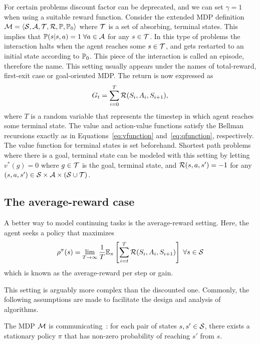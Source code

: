 \begin{example}
  For certain problems discount factor can be deprecated, and we can set $\gamma=1$ when using a suitable reward function. Consider the extended MDP definition $\mathcal{M}=\langle\mathcal{S},\mathcal{A},\mathcal{T},\mathcal{R},\mathbb{P},\mathbb{P}_0\rangle$ where $\mathcal{T}$ is a set of absorbing, terminal states. This implies that $\mathbb{P}(s\lvert s, a) = 1\;\forall a\in\mathcal{A}$ for any $s\in\mathcal{T}$. In this type of problems the interaction halts when the agent reaches some $s\in\mathcal{T}$, and gets restarted to an initial state according to $\mathbb{P}_0$. This piece of the interaction is called an episode, therefore the name. This setting usually appears under the names of total-reward, first-exit case or goal-oriented MDP. The return is now expressed as
  \begin{equation*}
    G_t = \sum_{i=0}^T \mathcal{R}(S_i, A_i, S_{i+1}),
  \end{equation*}
  where $T$ is a random variable that represents the timestep in which agent reaches some terminal state. The value and action-value functions satisfy the Bellman recursions exactly as in Equations~\eqref{eq:vfunction} and~\eqref{eq:qfunction}, respectively. The value function for terminal states is set beforehand. Shortest path problems where there is a goal, terminal state can be modeled with this setting by letting $v^*(g)=0$ where $g\in\mathcal{T}$ is the goal, terminal state, and $\linebreak\cR(s, a, s')=-1$ for any $(s,a,s')\in\mathcal{S}\times\mathcal{A}\times(\mathcal{S}\cup\mathcal{T})$.
\end{example}
\subsection{The average-reward case}
A better way to model continuing tasks is the average-reward setting. Here, the agent seeks a policy that maximizes 
\begin{equation}
  \rho^\pi(s) =\lim_{T\rightarrow\infty}\frac 1 T \mathbb{E}_\pi\left[\sum_{i=t}^T\mathcal{R}(S_i, A_i, S_{i+1})\right] \;\forall s\in\mathcal{S}
\end{equation}
which is known as the average-reward per step or gain.

This setting is arguably more complex than the discounted one. Commonly, the following assumptions are made to facilitate the design and analysis of algorithms.
\begin{assumption}
  The MDP $\mathcal{M}$ is communicating~\citep{Puterman1994}: for each pair of states $s,s'\in\mathcal{S}$, there exists a stationary policy $\pi$ that has non-zero probability of reaching $s'$ from $s$.
  \label{ass:mdp_communicating}
\end{assumption}


